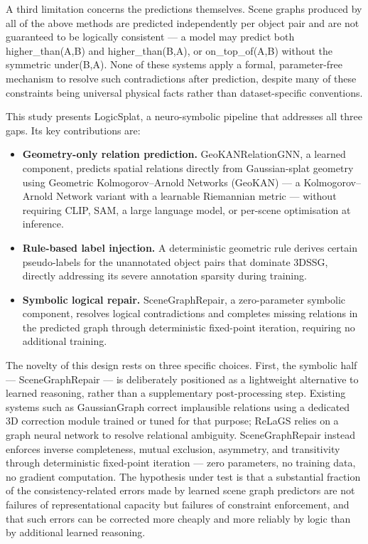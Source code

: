 \documentclass[sn-mathphys,Numbered]{sn-jnl}
\begin{document}
A third limitation concerns the predictions themselves. Scene graphs produced by all of the above methods are predicted independently per object pair and are not guaranteed to be logically consistent --- a model may predict both higher\_than(A,B) and higher\_than(B,A), or on\_top\_of(A,B) without the symmetric under(B,A). None of these systems apply a formal, parameter-free mechanism to resolve such contradictions after prediction, despite many of these constraints being universal physical facts rather than dataset-specific conventions.

This study presents LogicSplat, a neuro-symbolic pipeline that addresses all three gaps. Its key contributions are:

\begin{itemize}
\item \textbf{Geometry-only relation prediction.} GeoKANRelationGNN, a learned component, predicts spatial relations directly from Gaussian-splat geometry using Geometric Kolmogorov--Arnold Networks (GeoKAN) --- a Kolmogorov--Arnold Network variant with a learnable Riemannian metric --- without requiring CLIP, SAM, a large language model, or per-scene optimisation at inference.
\item \textbf{Rule-based label injection.} A deterministic geometric rule derives certain pseudo-labels for the unannotated object pairs that dominate 3DSSG, directly addressing its severe annotation sparsity during training.
\item \textbf{Symbolic logical repair.} SceneGraphRepair, a zero-parameter symbolic component, resolves logical contradictions and completes missing relations in the predicted graph through deterministic fixed-point iteration, requiring no additional training.
\end{itemize}

The novelty of this design rests on three specific choices. First, the symbolic half --- SceneGraphRepair --- is deliberately positioned as a lightweight alternative to learned reasoning, rather than a supplementary post-processing step. Existing systems such as GaussianGraph correct implausible relations using a dedicated 3D correction module trained or tuned for that purpose; ReLaGS relies on a graph neural network to resolve relational ambiguity. SceneGraphRepair instead enforces inverse completeness, mutual exclusion, asymmetry, and transitivity through deterministic fixed-point iteration --- zero parameters, no training data, no gradient computation. The hypothesis under test is that a substantial fraction of the consistency-related errors made by learned scene graph predictors are not failures of representational capacity but failures of constraint enforcement, and that such errors can be corrected more cheaply and more reliably by logic than by additional learned reasoning.
\end{document}
